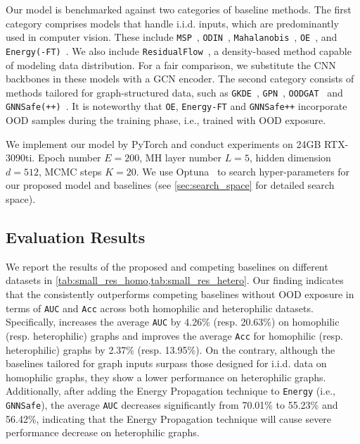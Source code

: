Our model is benchmarked against two categories of baseline methods. The first category comprises models that handle i.i.d. inputs, which are predominantly used in computer vision. These include \texttt{MSP}~\citep{hendrycks2016baseline}, \texttt{ODIN}~\citep{liang2018enhancing}, \texttt{Mahalanobis}~\citep{lee2018simple}, \texttt{OE}~\citep{hendrycks2018deep}, and \texttt{Energy(-FT)}~\citep{liu2020energy}. We also include \texttt{ResidualFlow}~\citep{zisselman2020deep}, a density-based method capable of modeling data distribution. For a fair comparison, we substitute the CNN backbones in these models with a GCN encoder. The second category consists of methods tailored for graph-structured data, such as \texttt{GKDE}~\citep{zhao2020uncertainty}, \texttt{GPN}~\citep{stadler2021graph}, \texttt{OODGAT}~\citep{song2022learning} and \texttt{GNNSafe(++)}~\citep{wu2022energy}. 
It is noteworthy that \texttt{OE}, \texttt{Energy-FT} and \texttt{GNNSafe++} incorporate OOD samples during the training phase, i.e., trained with OOD exposure. 




\label{sec:Implementation_details}
We implement our model by PyTorch and conduct experiments on 24GB RTX-3090ti. 
Epoch number $E=200$, MH layer number $L=5$, hidden dimension $d=512$, MCMC steps $K=20$.
We use Optuna~\citep{akiba2019optuna} to search hyper-parameters for our proposed model and baselines (see \cref{sec:search_space} for detailed search space).



\vspace{-2mm}
\subsection{Evaluation Results}
\vspace{-2mm}
\label{sec:main_result}
We report the results of the proposed \shortname and competing baselines on different datasets in \cref{tab:small_res_homo,tab:small_res_hetero}. 
Our finding indicates that the \shortname consistently outperforms competing baselines without OOD exposure in terms of \texttt{AUC} and \texttt{Acc} across both homophilic and heterophilic datasets. 
Specifically, \shortname increases the average \texttt{AUC} by 4.26\% (resp. 20.63\%) on homophilic (resp. heterophilic) graphs and improves the average \texttt{Acc} for homophilic (resp. heterophilic) graphs by 2.37\% (resp. 13.95\%). 
On the contrary, although the baselines tailored for graph inputs surpass those designed for i.i.d. data on homophilic graphs, they show a lower performance on heterophilic graphs. 
Additionally, after adding the Energy Propagation technique to \texttt{Energy} (i.e., \texttt{GNNSafe}), the average \texttt{AUC} decreases significantly from 70.01\% to 55.23\% and 56.42\%, indicating that the Energy Propagation technique will cause severe performance decrease on heterophilic graphs. 

